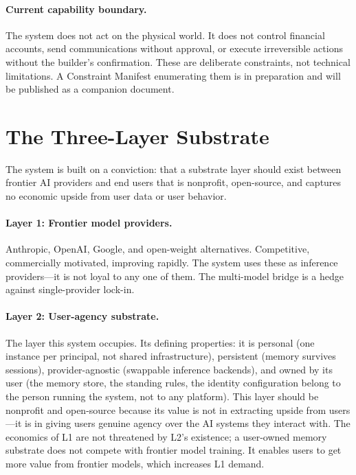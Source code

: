 \documentclass{article}
\begin{document}
\paragraph{Current capability boundary.}
The system does not act on the physical world. It does not control financial accounts, send communications without approval, or execute irreversible actions without the builder's confirmation. These are deliberate constraints, not technical limitations. A Constraint Manifest enumerating them is in preparation and will be published as a companion document.

\section{The Three-Layer Substrate}

The system is built on a conviction: that a substrate layer should exist between frontier AI providers and end users that is nonprofit, open-source, and captures no economic upside from user data or user behavior.

\paragraph{Layer 1: Frontier model providers.}
Anthropic, OpenAI, Google, and open-weight alternatives. Competitive, commercially motivated, improving rapidly. The system uses these as inference providers---it is not loyal to any one of them. The multi-model bridge is a hedge against single-provider lock-in.

\paragraph{Layer 2: User-agency substrate.}
The layer this system occupies. Its defining properties: it is personal (one instance per principal, not shared infrastructure), persistent (memory survives sessions), provider-agnostic (swappable inference backends), and owned by its user (the memory store, the standing rules, the identity configuration belong to the person running the system, not to any platform). This layer should be nonprofit and open-source because its value is not in extracting upside from users---it is in giving users genuine agency over the AI systems they interact with. The economics of L1 are not threatened by L2's existence; a user-owned memory substrate does not compete with frontier model training. It enables users to get more value from frontier models, which increases L1 demand.
\end{document}
